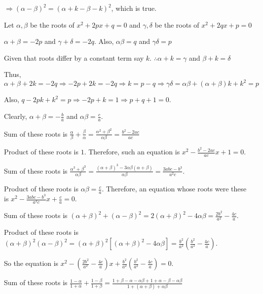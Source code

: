   $\Rightarrow (\alpha - \beta)^2 = (\alpha + k - \beta - k)^2$, which is true.
\item Let $\alpha, \beta$ be the roots of $x^2 + 2px + q = 0$ and $\gamma, \delta$ be the roots of
  $x^2 + 2qx + p = 0$

  $\alpha + \beta = -2p$ and $\gamma + \delta = -2q.$ Also, $\alpha\beta = q$ and
  $\gamma\delta = p$

  Given that roots differ by a constant term say $k$. $\therefore \alpha + k = \gamma$ and $\beta +
  k = \delta$

  Thus, $\alpha + \beta + 2k = -2q \Rightarrow -2p + 2k = -2q \Rightarrow k = p - q\Rightarrow
  \gamma\delta = \alpha\beta + (\alpha + \beta)k + k^2 = p$

  Also, $q - 2pk + k^2 = p \Rightarrow -2p + k = 1 \Rightarrow p + q + 1 = 0$.
\item Clearly, $\alpha + \beta = -\frac{b}{a}$ and $\alpha\beta = \frac{c}{a}$.
  \startitemize[i]
  \item Sum of these roots is $\frac{\alpha}{\beta} + \frac{\beta}{\alpha} = \frac{\alpha^2 +
    \beta^2}{\alpha\beta} = \frac{b^2 - 2ac}{ac}$

    Product of these roots is $1$. Therefore, such an equation is $x^2 -\frac{b^2 - 2ac}{ac}x + 1 = 0$.
  \item Sum of these roots is $\frac{\alpha^3 + \beta^3}{\alpha\beta} = \frac{(\alpha + \beta)^3 -
    3\alpha\beta(\alpha + \beta)}{\alpha\beta} = \frac{3abc - b^3}{a^2c}$.

    Product of these roots is $\alpha\beta = \frac{c}{a}$. Therefore, an equation whose roots were these is
    $x^2 - \frac{3abc - b^3}{a^2c}x + \frac{c}{a} = 0$.
  \item Sum of these roots is $(\alpha + \beta)^2 + (\alpha - \beta)^2 = 2(\alpha + \beta)^2 -
    4\alpha\beta = \frac{2b^2}{a^2} - \frac{4c}{a}$.

    Product of these roots is $(\alpha + \beta)^2(\alpha - \beta)^2 = (\alpha + \beta)^2[(\alpha +
      \beta)^2 - 4\alpha\beta] = \frac{b^2}{a^2}\left(\frac{b^2}{a^2} - \frac{4c}{a}\right)$.

    So the equation is $x^2 -\left(\frac{2b^2}{a^2} - \frac{4c}{a}\right)x +
    \frac{b^2}{a^2}\left(\frac{b^2}{a^2} - \frac{4c}{a}\right) = 0$.
  \item Sum of these roots is $\frac{1 - \alpha}{1 + \alpha} + \frac{1 - \beta}{1 + \beta} = \frac{1 +
    \beta - \alpha -\alpha\beta + 1 + \alpha - \beta -\alpha\beta}{1 + (\alpha + \beta) + \alpha\beta}$

